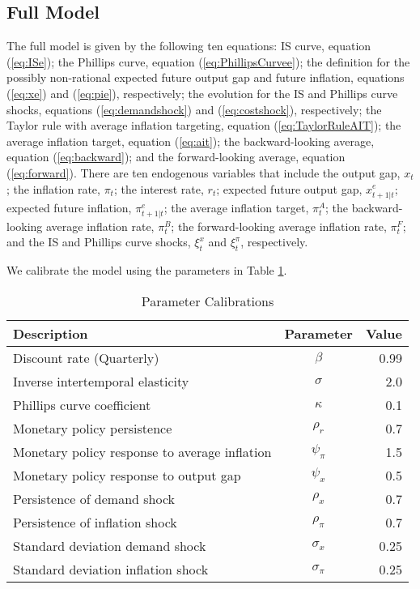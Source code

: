 \documentclass[12pt]{article}
\begin{document}
\subsection{Full Model}

The full model is given by the following ten equations: IS curve, equation (\ref{eq:ISe}); the Phillips curve, equation (\ref{eq:PhillipsCurvee}); the definition for the possibly non-rational expected future output gap and future inflation, equations (\ref{eq:xe}) and (\ref{eq:pie}), respectively; the evolution for the IS and Phillips curve shocks, equations (\ref{eq:demandshock}) and (\ref{eq:costshock}), respectively; the Taylor rule with average inflation targeting, equation (\ref{eq:TaylorRuleAIT}); the average inflation target, equation (\ref{eq:ait}); the backward-looking average, equation (\ref{eq:backward}); and the forward-looking average, equation (\ref{eq:forward}). There are ten endogenous variables that include the output gap, $x_t$; the inflation rate, $\pi_t$; the interest rate, $r_t$; expected future output gap, $x_{t+1|t}^e$; expected future inflation, $\pi_{t+1|t}^e$; the average inflation target, $\pi_t^A$; the backward-looking average inflation rate, $\pi_t^B$; the forward-looking average inflation rate, $\pi_t^F$; and the IS and Phillips curve shocks, $\xi_t^x$ and $\xi_t^\pi$, respectively.

We calibrate the model using the parameters in Table \ref{tb:parms}.

\begin{table}\caption{Parameter Calibrations}\label{tb:parms}
  \begin{center}
    \begin{tabular}{lcr} \hline
      Description & Parameter & Value \\ \hline
      Discount rate (Quarterly) & $\beta$ & 0.99 \\
      Inverse intertemporal elasticity & $\sigma$ & 2.0 \\
      Phillips curve coefficient & $\kappa$ & 0.1 \\
      Monetary policy persistence & $\rho_r$ & 0.7 \\
      Monetary policy response to average inflation & $\psi_\pi$ & 1.5 \\
      Monetary policy response to output gap & $\psi_x$ & 0.5 \\
      Persistence of demand shock & $\rho_x$ & 0.7 \\
      Persistence of inflation shock & $\rho_\pi$ & 0.7 \\
      Standard deviation demand shock & $\sigma_x$ & 0.25 \\
      Standard deviation inflation shock & $\sigma_\pi$ & 0.25 \\
      \hline
     \end{tabular}
  \end{center}
\end{table}
\end{document}
